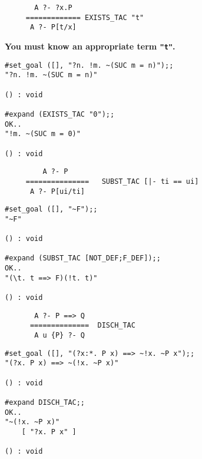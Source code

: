 
\vskip7mm
{\Large\begin{verbatim}
       A ?- ?x.P
     ============= EXISTS_TAC "t"
      A ?- P[t/x]
\end{verbatim}}
\bpindent\LARGE\bf
You must know an appropriate term \verb!"t"!.
\epindent

\begin{session}\begin{verbatim}
#set_goal ([], "?n. !m. ~(SUC m = n)");;
"?n. !m. ~(SUC m = n)"

() : void

#expand (EXISTS_TAC "0");;
OK..
"!m. ~(SUC m = 0)"

() : void
\end{verbatim}\end{session}



\vskip7mm
{\Large\begin{verbatim}
         A ?- P
     ===============   SUBST_TAC [|- ti == ui]
      A ?- P[ui/ti]
\end{verbatim}}

\vskip 5mm
\begin{session}\begin{verbatim}
#set_goal ([], "~F");;
"~F"

() : void

#expand (SUBST_TAC [NOT_DEF;F_DEF]);;
OK..
"(\t. t ==> F)(!t. t)"

() : void
\end{verbatim}\end{session}




\vskip7mm
{\Large\begin{verbatim}
       A ?- P ==> Q
      ==============  DISCH_TAC
       A u {P} ?- Q
\end{verbatim}}

\vskip 7mm
\begin{session}\begin{verbatim}
#set_goal ([], "(?x:*. P x) ==> ~!x. ~P x");;
"(?x. P x) ==> ~(!x. ~P x)"

() : void

#expand DISCH_TAC;;
OK..
"~(!x. ~P x)"
    [ "?x. P x" ]

() : void
\end{verbatim}\end{session}


